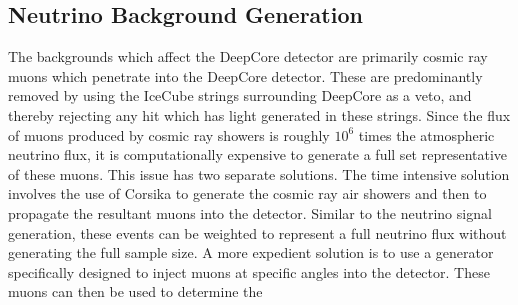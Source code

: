 \documentclass[../Main.tex]{subfiles}
\begin{document}
\subsection{Neutrino Background Generation}\label{sec:background}

The backgrounds which affect the DeepCore detector are primarily cosmic ray muons which penetrate into the DeepCore detector.  These are predominantly removed by using the IceCube strings surrounding DeepCore as a veto, and thereby rejecting any hit which has light generated in these strings.  Since the flux of muons produced by cosmic ray showers is roughly $10^6$ times the atmospheric neutrino flux, it is computationally expensive to generate a full set representative of these muons.  This issue has two separate solutions.  The time intensive solution involves the use of Corsika \cite{Heck} to generate the cosmic ray air showers and then to propagate the resultant muons into the detector.  Similar to the neutrino signal generation, these events can be weighted to represent a full neutrino flux without generating the full sample size.  A more expedient solution is to use a generator specifically designed to inject muons at specific angles into the detector.  These muons can then be used to determine the 

%
\end{document}
